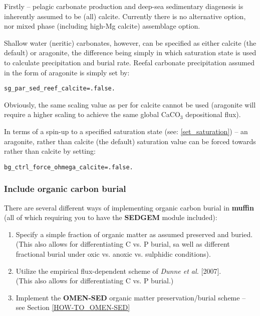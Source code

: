 \noindent Firstly -- pelagic carbonate production and deep-sea sedimentary diagenesis is inherently assumed to be (all) calcite. Currently there is no alternative option, nor mixed phase (including high-Mg calcite) assemblage option.

Shallow water (neritic) carbonates, however, can be specified as either calcite (the default) or aragonite, the difference being simply in which saturation state is used to calculate precipitation and burial rate. Reefal carbonate precipitation assumed in the form of aragonite is simply set by:
\vspace{-1mm}\small\begin{verbatim}
sg_par_sed_reef_calcite=.false.
\end{verbatim}\normalsize\vspace{-1mm}

\noindent Obviously, the same scaling value as per for calcite cannot be used (aragonite will require a higher scaling to achieve the same global CaCO${_3}$ depositional flux).

\vspace{1mm}
In terms of a spin-up to a specified saturation state (see: \ref{set_saturation}) -- an aragonite, rather than calcite (the default) saturation value can be forced towards rather than calcite by setting:
\vspace{-1mm}\small\begin{verbatim}
bg_ctrl_force_ohmega_calcite=.false.
\end{verbatim}\normalsize\vspace{-1mm}

%
\newpage
\subsubsection{Include organic carbon burial}\label{subsec:include_organic_carbon_burial}
\vspace{1mm}

There are several different ways of implementing organic carbon burial in \textbf{muffin} (all of which requiring you to have the \textbf{SEDGEM} module included):
\vspace{1mm}

\begin{enumerate}[noitemsep]
\vspace{1mm}
\item Specify a simple fraction of organic matter as assumed preserved and buried. \\(This also allows for differentiating C vs. P burial, sa well as different fractional burial under oxic vs. anoxic vs. sulphidic conditions).
\vspace{1mm}
\item Utilize the empirical flux-dependent scheme of \textit{Dunne et al.} [2007]. \\(This also allows for differentiating C vs. P burial.)
\vspace{1mm}
\item Implement the \textbf{OMEN-SED} organic matter preservation/burial scheme -- see Section \ref{HOW-TO_OMEN-SED}
\end{enumerate}


